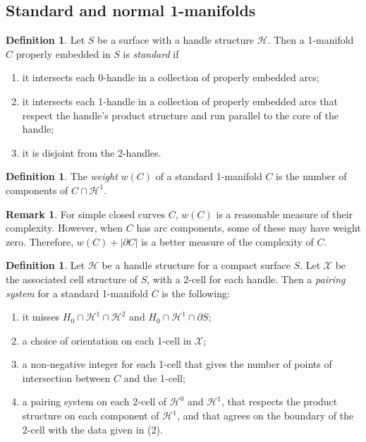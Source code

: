 \documentclass[oneside]{amsart}
\numberwithin{equation}{section}
\theoremstyle{plain}
\theoremstyle{definition}
\newtheorem{definition}[equation]{Definition}
\newtheorem{remark}[equation]{Remark}
\newcommand{\calH}{\mathcal{H}}
\newcommand{\calX}{\mathcal{X}}
\begin{document}
\subsection{Standard and normal 1-manifolds}

\begin{definition} 
Let $S$ be a surface with a handle structure $\calH$. Then a 1-manifold $C$ properly embedded in $S$ is \emph{standard} if
\begin{enumerate}
\item it intersects each 0-handle in a collection of properly embedded arcs;
\item it intersects each 1-handle in a collection of properly embedded arcs that respect the handle's product structure and run parallel to the core of the handle;
\item it is disjoint from the 2-handles.
\end{enumerate}
\end{definition}

\begin{definition}
The \emph{weight} $w(C)$ of a standard 1-manifold $C$ is the number of components of $C \cap \calH^1$.
\end{definition}

\begin{remark} 
For simple closed curves $C$, $w(C)$ is a reasonable measure of their complexity. However, when $C$ has arc components, some of these may have weight zero. Therefore, $w(C) + |\partial C|$ is a better measure of the complexity of $C$.
\end{remark}

\begin{definition} 
Let $\calH$ be a handle structure for a compact surface $S$. Let $\calX$ be the associated cell structure of $S$, with a 2-cell for each handle. Then a \emph{pairing system} for a standard 1-manifold $C$ is the following:
\begin{enumerate}
\item it misses $H_0 \cap \calH^1 \cap \calH^2$ and $H_0 \cap \calH^1 \cap \partial S$;
\item a choice of orientation on each 1-cell in $\calX$;
\item a non-negative integer for each 1-cell that gives the number of points of intersection
between $C$ and the 1-cell;
\item a pairing system on each 2-cell of $\calH^0$ and $\calH^1$, that respects the product structure on each component of $\calH^1$, and that agrees on the boundary of the 2-cell with the data given in (2).
\end{enumerate}
\end{definition}
\end{document}
